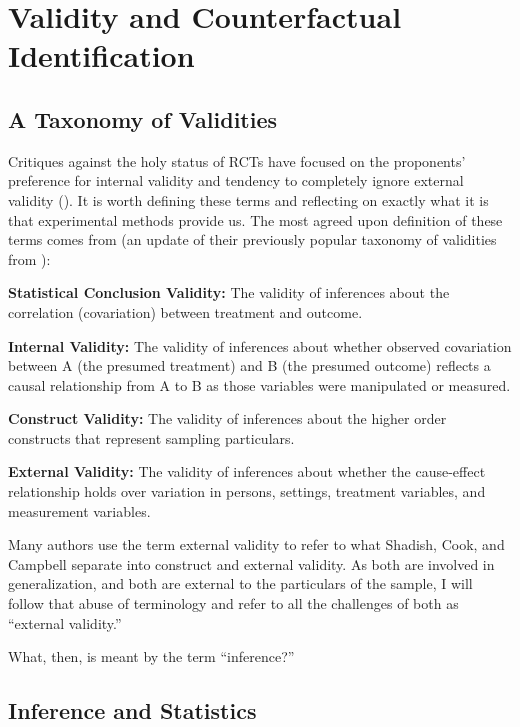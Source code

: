 \documentclass[a4paper,12pt]{article}
\begin{document}
\section{Validity and Counterfactual Identification}

\subsection{A Taxonomy of Validities}

Critiques against the holy status of RCTs have focused on the proponents' preference for internal validity and tendency to completely ignore external validity (\cite{Manski2013, Deaton2018}). It is worth defining these terms and reflecting on exactly what it is that experimental methods provide us. The most agreed upon definition of these terms comes from \cite{Shadish2002} (an update of their previously popular taxonomy of validities from \cite{Cook1979}):

\begin{displayquote}
\textbf{Statistical Conclusion Validity:} The validity of inferences about the correlation (covariation) between treatment and outcome.

\textbf{Internal Validity:} The validity of inferences about whether observed covariation between A (the presumed treatment) and B (the presumed outcome) reflects a causal relationship from A to B as those variables were manipulated or measured.

\textbf{Construct Validity:} The validity of inferences about the higher order constructs that represent sampling particulars.

\textbf{External Validity:} The validity of inferences about whether the cause-effect relationship holds over variation in persons, settings, treatment variables, and measurement variables.
\end{displayquote}

Many authors use the term external validity to refer to what Shadish, Cook, and Campbell separate into construct and external validity. As both are involved in generalization, and both are external to the particulars of the sample, I will follow that abuse of terminology and refer to all the challenges of both as ``external validity.''

What, then, is meant by the term ``inference?''

\subsection{Inference and Statistics}
\end{document}
